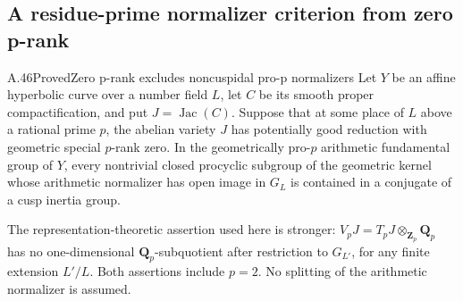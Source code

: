\subsection{A residue-prime normalizer criterion from zero p-rank}

\begin{statement}{A.46}{Proved}{Zero p-rank excludes noncuspidal pro-p normalizers}
Let \(Y\) be an affine hyperbolic curve over a number field \(L\),
let \(C\) be its smooth proper compactification, and put
\(J=\operatorname{Jac}(C)\). Suppose that at some place of \(L\)
above a rational prime \(p\), the abelian variety \(J\) has
potentially good reduction with geometric special \(p\)-rank zero.
In the geometrically pro-\(p\) arithmetic fundamental group of \(Y\),
every nontrivial closed procyclic subgroup of the geometric kernel
whose arithmetic normalizer has open image in \(G_L\) is contained
in a conjugate of a cusp inertia group.

The representation-theoretic assertion used here is stronger:
\(V_pJ=T_pJ\otimes_{\mathbf Z_p}\mathbf Q_p\) has no
one-dimensional \(\mathbf Q_p\)-subquotient after restriction to
\(G_{L'}\), for any finite extension \(L'/L\).
Both assertions include \(p=2\). No splitting of the arithmetic
normalizer is assumed.
\end{statement}

